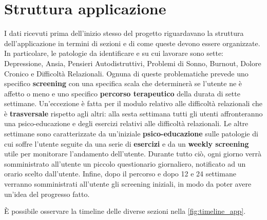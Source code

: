 \section{Struttura applicazione}
\label{chap:struttura_applicazione}
I dati ricevuti prima dell'inizio stesso del progetto riguardavano la struttura dell'applicazione in termini di sezioni e di come queste devono essere organizzate. In particolare, le patologie da identificare e su cui lavorare sono sette: Depressione, Ansia, Pensieri Autodistruttivi, Problemi di Sonno, Burnout, Dolore Cronico e Difficoltà Relazionali. Ognuna di queste problematiche prevede uno specifico \textbf{screening} con una specifica scala che determinerà se l'utente ne è affetto o meno e uno specifico \textbf{percorso terapeutico} della durata di sette settimane. Un'eccezione è fatta per il modulo relativo alle difficoltà relazionali che è \textbf{trasversale} rispetto agli altri: alla sesta settimana tutti gli utenti affronteranno una psico-educazione e degli esercizi relativi alle difficoltà relazionali. Le altre settimane sono caratterizzate da un'iniziale \textbf{psico-educazione} sulle patologie di cui soffre l'utente seguite da una serie di \textbf{esercizi} e da un \textbf{weekly screening} utile per monitorare l'andamento dell'utente. Durante tutto ciò, ogni giorno verrà somministrato all'utente un piccolo questionario giornaliero, notificato ad un orario scelto dall'utente.
Infine, dopo il percorso e dopo 12 e 24 settimane verranno somministrati all'utente gli screening iniziali, in modo da poter avere un'idea del progresso fatto.

È possibile osservare la timeline delle diverse sezioni nella \autoref{fig:timeline_app}.

